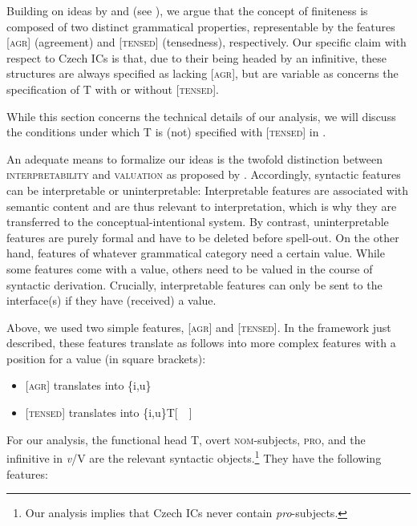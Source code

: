\documentclass[output=paper,colorlinks,citecolor=brown,
modfonts,newtxmath
]{langscibook}
\begin{document}
Building on ideas by \citet{Stowell1982,Stowell1995} and \citet{Wurmbrand2001} (see ), we argue that the concept of finiteness is composed of two distinct grammatical properties, representable by the features [\textsc{agr}] (agreement) and [\textsc{tensed}] (tensedness), respectively. Our specific claim with respect to Czech ICs is that, due to their being headed by an infinitive, these structures are always specified as lacking [\textsc{agr}], but are variable as concerns the specification of T with or without [\textsc{tensed}].

While this section concerns the technical details of our analysis, we will discuss the conditions under which T is (not) specified with [\textsc{tensed}] in . 

An adequate means to formalize our ideas is the twofold distinction between \textsc{interpretability} and \textsc{valuation} as proposed by \citet{PesetskyTorrego2001}. Accordingly, syntactic features can be interpretable or uninterpretable: Interpretable features are associated with semantic content and are thus relevant to interpretation, which is why they are transferred to the conceptual-intentional system. By contrast, uninterpretable features are purely formal and have to be deleted before spell-out. On the other hand, features of whatever grammatical category need a certain value. While some features come with a value, others need to be valued in the course of syntactic derivation. Crucially, interpretable features can only be sent to the interface(s) if they have (received) a value.

Above, we used two simple features, [\textsc{agr}] and [\textsc{tensed}]. In the framework just described, these features translate as follows into more complex features with a position for a value (in square brackets):

\begin{itemize}

\item {[}\textsc{agr}] translates into \{i,u\}\textPhi[~~]

\item {[}\textsc{tensed}] translates into \{i,u\}T[~~]

\end{itemize}

\noindent For our analysis, the functional head T, overt \textsc{nom}-subjects, \textsc{pro}, and the infinitive in \textit{v}/V are the relevant syntactic objects.\footnote{Our analysis implies that Czech ICs never contain \textit{pro}-subjects.} They have the following features:
\end{document}
